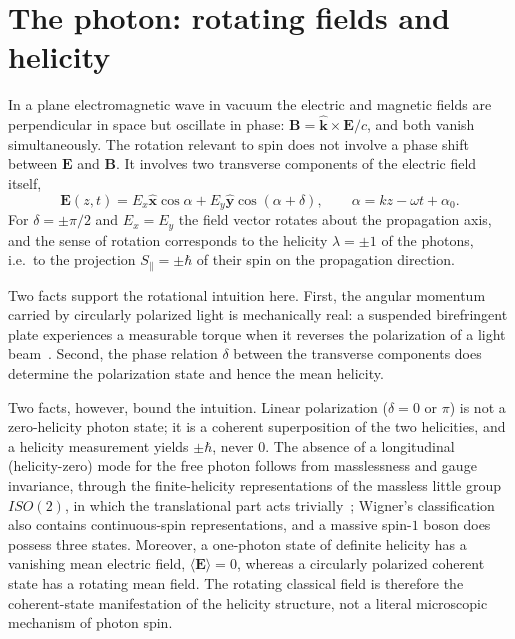 \documentclass[11pt,a4paper]{article}
\begin{document}
\section{The photon: rotating fields and helicity}
\label{sec:photon}

In a plane electromagnetic wave in vacuum the electric and magnetic fields are perpendicular in space but
oscillate in phase: $\mathbf{B} = \hat{\mathbf{k}} \times \mathbf{E}/c$, and both vanish simultaneously.
The rotation relevant to spin does not involve a phase shift between $\mathbf{E}$ and $\mathbf{B}$.
It involves two transverse components of the electric field itself,
\begin{equation}
\mathbf{E}(z,t) = E_x \hat{\mathbf{x}} \cos\alpha + E_y \hat{\mathbf{y}} \cos(\alpha + \delta),
\qquad \alpha = kz - \omega t + \alpha_0 .
\label{eq:transverse}
\end{equation}
For $\delta = \pm\pi/2$ and $E_x = E_y$ the field vector rotates about the propagation axis, and the sense
of rotation corresponds to the helicity $\lambda = \pm 1$ of the photons, i.e.\ to the projection
$S_\parallel = \pm\hbar$ of their spin on the propagation direction.

Two facts support the rotational intuition here.
First, the angular momentum carried by circularly polarized light is mechanically real: a suspended
birefringent plate experiences a measurable torque when it reverses the polarization of a light
beam~\cite{Beth1936}.
Second, the phase relation $\delta$ between the transverse components does determine the polarization state
and hence the mean helicity.

Two facts, however, bound the intuition.
Linear polarization ($\delta = 0$ or $\pi$) is not a zero-helicity photon state; it is a coherent
superposition of the two helicities, and a helicity measurement yields $\pm\hbar$, never $0$.
The absence of a longitudinal (helicity-zero) mode for the free photon follows from masslessness and gauge
invariance, through the finite-helicity representations of the massless little group $ISO(2)$, in which the
translational part acts trivially~\cite{Wigner1939}; Wigner's classification also contains continuous-spin
representations, and a massive spin-$1$ boson does possess three states.
Moreover, a one-photon state of definite helicity has a vanishing mean electric field,
$\langle \mathbf{E} \rangle = 0$, whereas a circularly polarized coherent state has a rotating mean field.
The rotating classical field is therefore the coherent-state manifestation of the helicity structure, not a
literal microscopic mechanism of photon spin.
\end{document}

